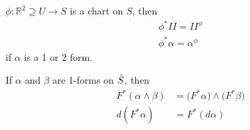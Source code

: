 \documentclass[10pt]{article}
\begin{document}
            \begin{example}
                $\phi: \mathbb{R}^2\supseteq U\rightarrow S$ is a chart on $S$, then
                \begin{equation*}
                    \begin{aligned}
                        \phi^*II = II^\phi \\
                        \phi^*\alpha = \alpha^\phi
                    \end{aligned}
                \end{equation*}
                if $\alpha$ is a 1 or 2 form.
            \end{example}
            \begin{proposition}
                If $\alpha$ and $\beta$ are 1-forms on $\Bar{S}$, then
                \begin{equation*}
                    \begin{aligned}
                        F^*(\alpha\wedge\beta) &= \big(F^*\alpha\big)\wedge\big(F^*\beta\big) \\
                        d(F^*\alpha) &= F^*(d\alpha)
                    \end{aligned}
                \end{equation*}
            \end{proposition}
\end{document}

